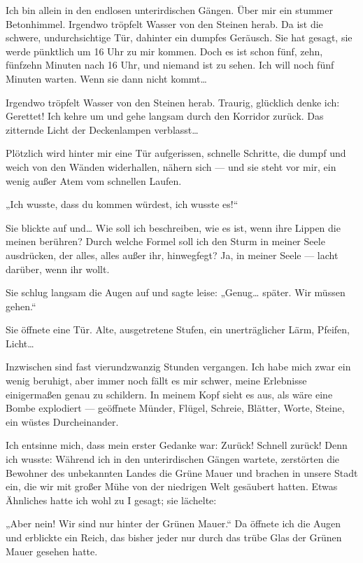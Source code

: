 Ich bin allein in den endlosen unterirdischen Gängen. Über mir ein
stummer Betonhimmel. Irgendwo tröpfelt Wasser von den Steinen
herab. Da ist die schwere, undurchsichtige Tür, dahinter ein
dumpfes Geräusch. Sie hat gesagt, sie werde pünktlich um 16 Uhr zu
mir kommen. Doch es ist schon fünf, zehn, fünfzehn Minuten nach 16
Uhr, und niemand ist zu sehen. Ich will noch fünf Minuten warten.
Wenn sie dann nicht kommt\ldots{}

Irgendwo tröpfelt Wasser von den Steinen herab. Traurig, glücklich
denke ich: Gerettet! Ich kehre um und gehe langsam durch den
Korridor zurück. Das zitternde Licht der Deckenlampen verblasst\ldots{}

Plötzlich wird hinter mir eine Tür aufgerissen, schnelle Schritte,
die dumpf und weich von den Wänden widerhallen, nähern sich — und
sie steht vor mir, ein wenig außer Atem vom schnellen Laufen.

„Ich wusste, dass du kommen würdest, ich wusste es!“

Sie blickte
auf und\ldots{} Wie soll ich beschreiben, wie es ist, wenn ihre Lippen
die meinen berühren? Durch welche Formel soll ich den Sturm in
meiner Seele ausdrücken, der alles, alles außer ihr, hinwegfegt?
Ja, in meiner Seele — lacht darüber, wenn ihr wollt.

Sie schlug
langsam die Augen auf und sagte leise: „Genug\ldots{} später. Wir müssen
gehen.“

Sie öffnete eine Tür. Alte, ausgetretene Stufen, ein
unerträglicher Lärm, Pfeifen, Licht\ldots{}

\bigpar
Inzwischen sind fast vierundzwanzig Stunden vergangen. Ich habe
mich zwar ein wenig beruhigt, aber immer noch
fällt es mir schwer, meine Erlebnisse einigermaßen genau zu
schildern. In meinem Kopf sieht es aus, als wäre eine Bombe
explodiert — geöffnete Münder, Flügel, Schreie, Blätter, Worte,
Steine, ein wüstes Durcheinander.

Ich entsinne mich, dass mein
erster Gedanke war: Zurück! Schnell zurück! Denn ich wusste:
Während ich in den unterirdischen Gängen wartete, zerstörten die
Bewohner des unbekannten Landes die Grüne Mauer und brachen in
unsere Stadt ein, die wir mit großer Mühe von der niedrigen Welt
gesäubert hatten. Etwas Ähnliches hatte ich wohl zu I gesagt; sie
lächelte:

„Aber nein! Wir sind nur hinter der Grünen Mauer.“ Da öffnete ich
die Augen und erblickte ein Reich, das bisher jeder nur durch das
trübe Glas der Grünen Mauer gesehen hatte.

